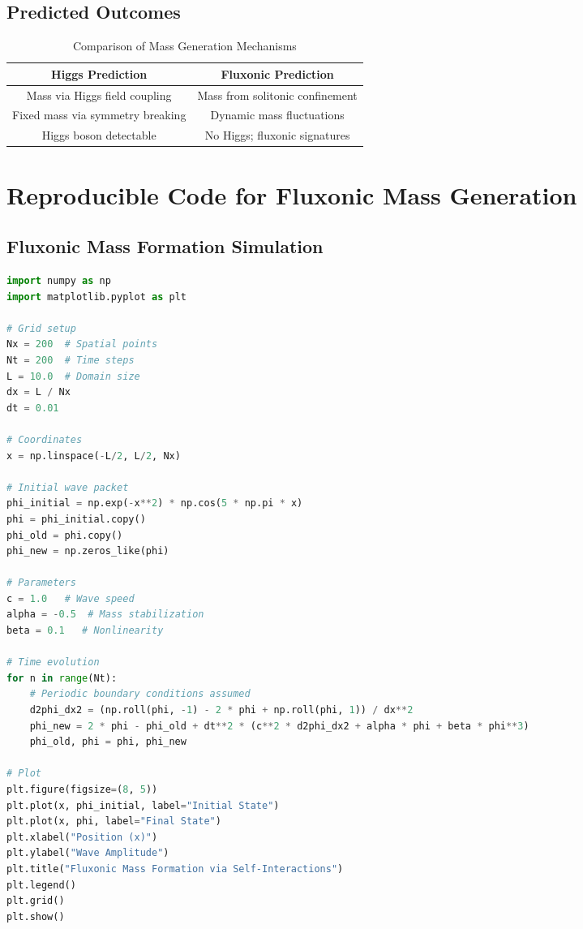 \documentclass{article}
\begin{document}
\subsection{Predicted Outcomes}
\begin{table}[h]
    \centering
    \begin{tabular}{|c|c|}
        \hline
        \textbf{Higgs Prediction} & \textbf{Fluxonic Prediction} \\
        \hline
        Mass via Higgs field coupling & Mass from solitonic confinement \\
        Fixed mass via symmetry breaking & Dynamic mass fluctuations \\
        Higgs boson detectable & No Higgs; fluxonic signatures \\
        \hline
    \end{tabular}
    \caption{Comparison of Mass Generation Mechanisms}
    \label{tab:predictions}
\end{table}

\section{Reproducible Code for Fluxonic Mass Generation}
\subsection{Fluxonic Mass Formation Simulation}
\begin{lstlisting}[language=Python, caption=Fluxonic Mass Formation Simulation, label=lst:mass]
import numpy as np
import matplotlib.pyplot as plt

# Grid setup
Nx = 200  # Spatial points
Nt = 200  # Time steps
L = 10.0  # Domain size
dx = L / Nx
dt = 0.01

# Coordinates
x = np.linspace(-L/2, L/2, Nx)

# Initial wave packet
phi_initial = np.exp(-x**2) * np.cos(5 * np.pi * x)
phi = phi_initial.copy()
phi_old = phi.copy()
phi_new = np.zeros_like(phi)

# Parameters
c = 1.0   # Wave speed
alpha = -0.5  # Mass stabilization
beta = 0.1   # Nonlinearity

# Time evolution
for n in range(Nt):
    # Periodic boundary conditions assumed
    d2phi_dx2 = (np.roll(phi, -1) - 2 * phi + np.roll(phi, 1)) / dx**2
    phi_new = 2 * phi - phi_old + dt**2 * (c**2 * d2phi_dx2 + alpha * phi + beta * phi**3)
    phi_old, phi = phi, phi_new

# Plot
plt.figure(figsize=(8, 5))
plt.plot(x, phi_initial, label="Initial State")
plt.plot(x, phi, label="Final State")
plt.xlabel("Position (x)")
plt.ylabel("Wave Amplitude")
plt.title("Fluxonic Mass Formation via Self-Interactions")
plt.legend()
plt.grid()
plt.show()
\end{lstlisting}
\end{document}

